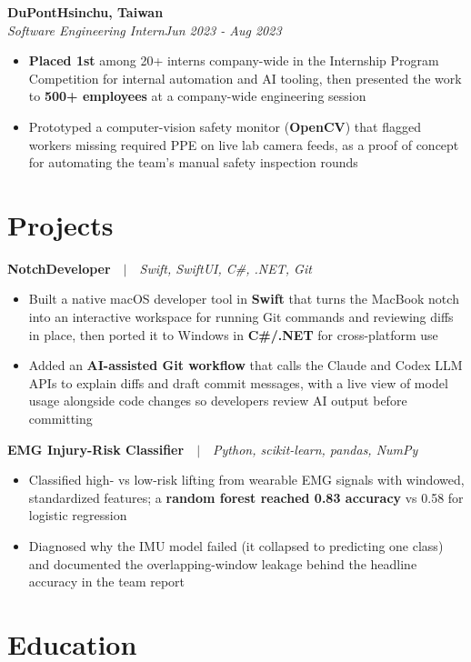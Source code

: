 \documentclass[letterpaper,11pt]{article}
\newcommand{\jobentry}[4]{%
  \textbf{#1}\hfill\textbf{#2}\\
  \textit{#3}\hfill\textit{#4}\par\vspace{1pt}}
\newcommand{\projectentry}[2]{\textbf{#1}\ \ $|$\ \ \textit{#2}\par\vspace{1pt}}
\newcommand{\entrygap}{\vspace{4pt}}
\begin{document}
\jobentry{DuPont}{Hsinchu, Taiwan}{Software Engineering Intern}{Jun 2023 - Aug 2023}
\begin{itemize}
  \item \textbf{Placed 1st} among 20+ interns company-wide in the Internship Program Competition for internal automation and AI tooling, then presented the work to \textbf{500+ employees} at a company-wide engineering session
  \item Prototyped a computer-vision safety monitor (\textbf{OpenCV}) that flagged workers missing required PPE on live lab camera feeds, as a proof of concept for automating the team's manual safety inspection rounds
\end{itemize}

\section{Projects}

\projectentry{NotchDeveloper}{Swift, SwiftUI, C\#, .NET, Git}
\begin{itemize}
  \item Built a native macOS developer tool in \textbf{Swift} that turns the MacBook notch into an interactive workspace for running Git commands and reviewing diffs in place, then ported it to Windows in \textbf{C\#/.NET} for cross-platform use
  \item Added an \textbf{AI-assisted Git workflow} that calls the Claude and Codex LLM APIs to explain diffs and draft commit messages, with a live view of model usage alongside code changes so developers review AI output before committing
\end{itemize}
\entrygap

\projectentry{EMG Injury-Risk Classifier}{Python, scikit-learn, pandas, NumPy}
\begin{itemize}
  \item Classified high- vs low-risk lifting from wearable EMG signals with windowed, standardized features; a \textbf{random forest reached 0.83 accuracy} vs 0.58 for logistic regression
  \item Diagnosed why the IMU model failed (it collapsed to predicting one class) and documented the overlapping-window leakage behind the headline accuracy in the team report
\end{itemize}

\section{Education}
\end{document}
